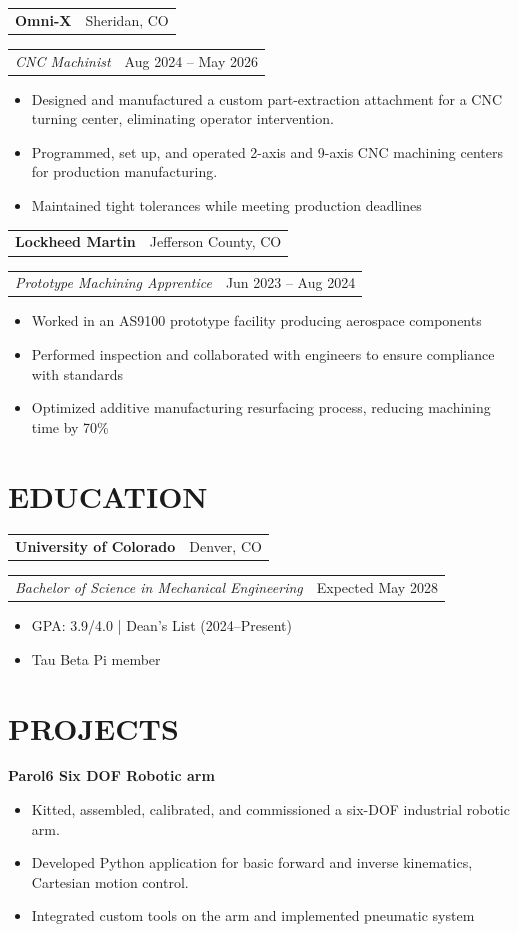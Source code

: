 \documentclass[10pt]{article}
\makeatletter
\newcommand{\companyLine}[2]{
\noindent
\begin{tabular*}{\textwidth}{@{\extracolsep{\fill}} l r}
\textbf{#1} & #2 \\
\end{tabular*}
}
\newcommand{\roleLine}[2]{
\noindent
\begin{tabular*}{\textwidth}{@{\extracolsep{\fill}} l r}
\textit{#1} & #2 \\
\end{tabular*}
}
\makeatother
\begin{document}
\vspace{.2em}

\companyLine{Omni-X}{Sheridan, CO}
\roleLine{CNC Machinist}{Aug 2024 -- May 2026}
\begin{itemize}
\item Designed and manufactured a custom part-extraction attachment for a CNC turning center, eliminating operator intervention.
\item Programmed, set up, and operated 2-axis and 9-axis CNC machining centers for production manufacturing.
\item Maintained tight tolerances while meeting production deadlines
\end{itemize}
\vspace{.2em}

\companyLine{Lockheed Martin}{Jefferson County, CO}
\roleLine{Prototype Machining Apprentice}{Jun 2023 -- Aug 2024}
\begin{itemize}
\item Worked in an AS9100 prototype facility producing aerospace components
\item Performed inspection and collaborated with engineers to ensure compliance with standards
\item Optimized additive manufacturing resurfacing process, reducing machining time by 70\%
\end{itemize}
\vspace{.2em}

\section*{EDUCATION}

\companyLine{University of Colorado}{Denver, CO}
\roleLine{Bachelor of Science in Mechanical Engineering}{Expected May 2028}
\begin{itemize}
\item GPA: 3.9/4.0 | Dean's List (2024–Present)
\item Tau Beta Pi member

\end{itemize}

\section*{PROJECTS}

\textbf{Parol6 Six DOF Robotic arm}
\begin{itemize}
\item Kitted, assembled, calibrated, and commissioned a six-DOF industrial robotic arm.
\item Developed Python application for basic forward and inverse kinematics, Cartesian motion control.
\item Integrated custom tools on the arm and implemented pneumatic system
\end{itemize}
\end{document}
